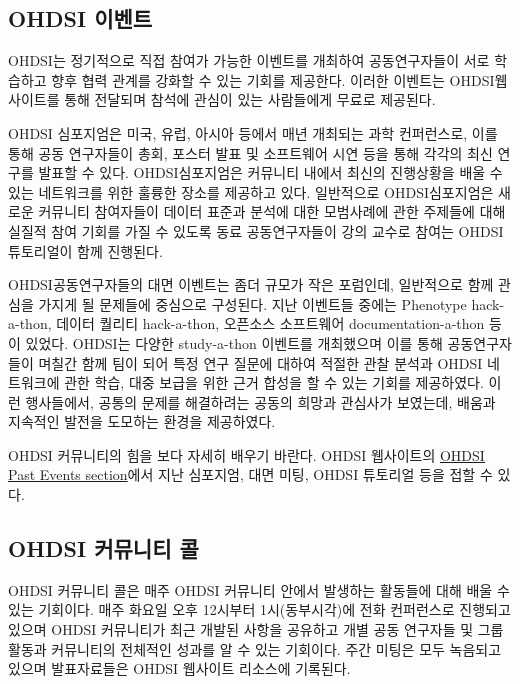 \documentclass[11pt]{book}
\theoremstyle{definition}
\theoremstyle{definition}
\theoremstyle{definition}
\theoremstyle{remark}
\begin{document}
\hypertarget{ohdsi-}{\subsection{OHDSI 이벤트}\label{ohdsi-}}

OHDSI는 정기적으로 직접 참여가 가능한 이벤트를 개최하여 공동연구자들이
서로 학습하고 향후 협력 관계를 강화할 수 있는 기회를 제공한다. 이러한
이벤트는 OHDSI웹사이트를 통해 전달되며 참석에 관심이 있는 사람들에게
무료로 제공된다.

OHDSI 심포지엄은 미국, 유럽, 아시아 등에서 매년 개최되는 과학
컨퍼런스로, 이를 통해 공동 연구자들이 총회, 포스터 발표 및 소프트웨어
시연 등을 통해 각각의 최신 연구를 발표할 수 있다. OHDSI심포지엄은
커뮤니티 내에서 최신의 진행상황을 배울 수 있는 네트워크를 위한 훌륭한
장소를 제공하고 있다. 일반적으로 OHDSI심포지엄은 새로운 커뮤니티
참여자들이 데이터 표준과 분석에 대한 모범사례에 관한 주제들에 대해
실질적 참여 기회를 가질 수 있도록 동료 공동연구자들이 강의 교수로 참여는
OHDSI 튜토리얼이 함께 진행된다.

OHDSI공동연구자들의 대면 이벤트는 좀더 규모가 작은 포럼인데, 일반적으로
함께 관심을 가지게 될 문제들에 중심으로 구성된다. 지난 이벤트들 중에는
Phenotype hack-a-thon, 데이터 퀄리티 hack-a-thon, 오픈소스 소프트웨어
documentation-a-thon 등이 있었다. OHDSI는 다양한 study-a-thon 이벤트를
개최했으며 이를 통해 공동연구자들이 며칠간 함께 팀이 되어 특정 연구
질문에 대하여 적절한 관찰 분석과 OHDSI 네트워크에 관한 학습, 대중 보급을
위한 근거 합성을 할 수 있는 기회를 제공하였다. 이런 행사들에서, 공통의
문제를 해결하려는 공동의 희망과 관심사가 보였는데, 배움과 지속적인
발전을 도모하는 환경을 제공하였다.

OHDSI 커뮤니티의 힘을 보다 자세히 배우기 바란다. OHDSI 웹사이트의
\href{https://www.ohdsi.org/past-events/}{OHDSI Past Events section}에서
지난 심포지엄, 대면 미팅, OHDSI 튜토리얼 등을 접할 수 있다.

\subsection{OHDSI 커뮤니티 콜}\label{ohdsi--}

OHDSI 커뮤니티 콜은 매주 OHDSI 커뮤니티 안에서 발생하는 활동들에 대해
배울 수 있는 기회이다. 매주 화요일 오후 12시부터 1시(동부시각)에 전화
컨퍼런스로 진행되고 있으며 OHDSI 커뮤니티가 최근 개발된 사항을 공유하고
개별 공동 연구자들 및 그룹 활동과 커뮤니티의 전체적인 성과를 알 수 있는
기회이다. 주간 미팅은 모두 녹음되고 있으며 발표자료들은 OHDSI 웹사이트
리소스에 기록된다.
\end{document}
